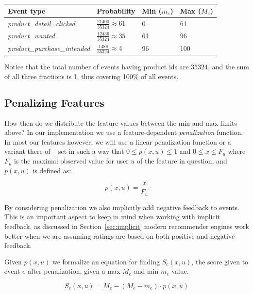 \begin{table}[H]
  \centering
  \begin{tabular}{llll}
    \toprule
      Event type & Probability & Min ($m_e$) & Max ($M_e$) \\
    \midrule
      \textit{product\_detail\_clicked}     & $\frac{21400}{35324} \approx 61$  & 0   & 61  \\[1.5ex]
      \textit{product\_wanted}              & $\frac{12436}{35324} \approx 35$  & 61  & 96  \\[1.5ex]
      \textit{product\_purchase\_intended}  & $\frac{1488}{35324} \approx 4$    & 96  & 100 \\
    \bottomrule
  \end{tabular}
\end{table}

Notice that the total number of events having product ids are $35324$, and the
sum of all three fractions is 1, thus covering 100\% of all events.

\subsection{Penalizing Features}

How then do we distribute the feature-values  between the min and max limits
above? In our implementation we use a feature-dependent \textit{penalization}
function. In most our features however, we will use a linear penalization
function or a variant there of -- set in such a way that $0 \leq p(x,u) \leq 1$
and $0 \leq x \leq F_u$ where $F_u$ is the maximal observed value for user $u$
of the feature in question, and $p(x,u)$ is defined as:

\begin{equation}
  p(x, u) = \frac{x}{F_u}
  \label{eq-lin-penalization}
\end{equation}

By considering penalization we also implicitly add negative feedback to events.
This is an important aspect to keep in mind when working with implicit
feedback, as discussed in Section~\ref{sec:implicit} modern recommender
engines work better when we are assuming ratings are based on both positive and
negative feedback.

Given $p(x, u)$ we formalize an equation for finding $S_e(x, u)$, the score
given to event $e$ after penalization, given a max $M_e$ and min $m_e$ value.

\begin{equation}
  S_e(x,u) = M_e - (M_e - m_e) \cdot p(x, u)
\end{equation}

